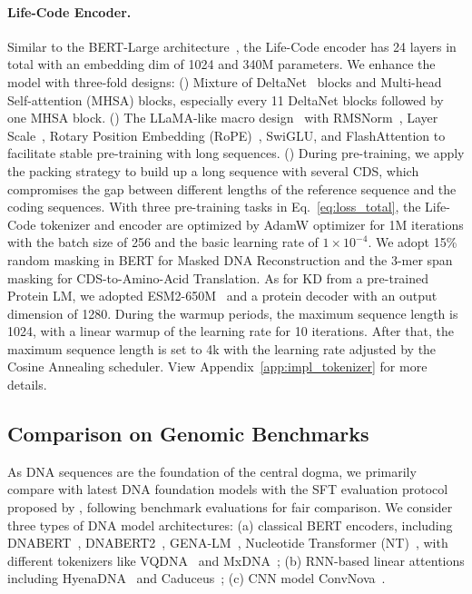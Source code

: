 \paragraph{Life-Code Encoder.}
Similar to the BERT-Large architecture~\citep{devlin2019bert}, the Life-Code encoder has 24 layers in total with an embedding dim of 1024 and 340M parameters. We enhance the model with three-fold designs: () Mixture of DeltaNet~\citep{yang2025deltanet} blocks and Multi-head Self-attention (MHSA) blocks, especially every 11 DeltaNet blocks followed by one MHSA block. () The LLaMA-like macro design~\citep{Touvron2023LLaMA} with RMSNorm~\citep{Zhang2019RMSNorm}, Layer Scale~\citep{iccv2021CaiT}, Rotary Position Embedding (RoPE)~\citep{Su2021RoFormer}, SwiGLU, and FlashAttention to facilitate stable pre-training with long sequences. () During pre-training, we apply the packing strategy \citep{Warner2024ModernBERT} to build up a long sequence with several CDS, which compromises the gap between different lengths of the reference sequence and the coding sequences.
With three pre-training tasks in Eq.~\ref{eq:loss_total}, the Life-Code tokenizer and encoder are optimized by AdamW optimizer for 1M iterations with the batch size of 256 and the basic learning rate of $1\times 10^{-4}$. We adopt 15\% random masking in BERT for Masked DNA Reconstruction and the 3-mer span masking for CDS-to-Amino-Acid Translation. As for KD from a pre-trained Protein LM, we adopted ESM2-650M~\citep{lin2022ESM2} and a protein decoder with an output dimension of 1280. During the warmup periods, the maximum sequence length is 1024, with a linear warmup of the learning rate for 10 iterations. After that, the maximum sequence length is set to 4k with the learning rate adjusted by the Cosine Annealing scheduler.
View Appendix~\ref{app:impl_tokenizer} for more details.

\vspace{-0.5em}
\subsection{Comparison on Genomic Benchmarks}
\label{sec:dna_comparison}
As DNA sequences are the foundation of the central dogma, we primarily compare with latest DNA foundation models with the SFT evaluation protocol proposed by \citep{nips2024hyenadna, iclr2024dnabert2}, following benchmark evaluations for fair comparison.
We consider three types of DNA model architectures: (a) classical BERT encoders, including DNABERT~\citep{BioInfo2021dnabert}, DNABERT2~\citep{iclr2024dnabert2}, GENA-LM~\citep{fishman2023GenaLM}, Nucleotide Transformer (NT)~\citep{NM2023NucleotideTrans}, with different tokenizers like VQDNA~\citep{icml2024vqdna} and MxDNA~\citep{nips2024MXDNA}; (b) RNN-based linear attentions including HyenaDNA~\citep{nips2024hyenadna} and Caduceus~\citep{icml2024caduceus}; (c) CNN model ConvNova~\citep{iclr2025convnova}.

